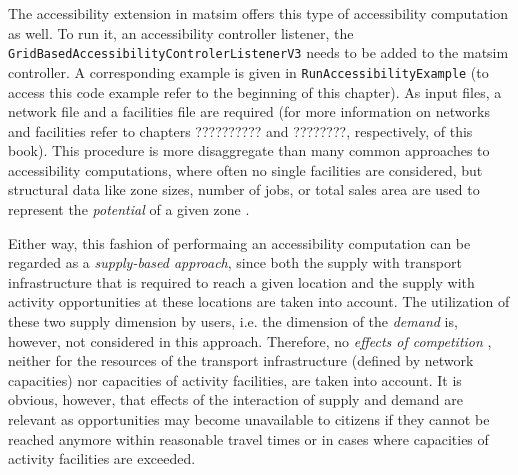 %

The accessibility extension in \gls{matsim} offers this type of accessibility computation as well. To run it, an 
accessibility controller listener, \eg the \lstinline{GridBasedAccessibilityControlerListenerV3} needs to be added to 
the \gls{matsim} controller. A corresponding example is given in \lstinline{RunAccessibilityExample} (to access this 
code example refer to the beginning of this chapter). As input files, a network file and a facilities file are required
(for more information on networks and facilities refer to chapters ?????????? and ????????, respectively, of this book).
This procedure is more disaggregate than many common approaches to accessibility computations, where often no single 
facilities are considered, but structural data like zone sizes, number of jobs, or total sales area are used to 
represent the \textit{potential} of a given zone 
\citep{BuettnerEtAl2010Erreichbarkeitsatlas, GulhanEtAl2014PotentialAccessibilityMeasureDenizli}.


Either way, this fashion of performaing an accessibility computation can be regarded as a \textit{supply-based approach}, 
since both the supply with transport infrastructure that is required to reach a given location and the supply with 
activity opportunities at these locations are taken into account. The utilization of these two supply dimension by users, 
i.e. the dimension of the \textit{demand} is, however, not considered in this approach. Therefore, no 
\textit{effects of competition} \citep{Geurs2004AccessibilityReview}, neither for the resources of the transport 
infrastructure (defined by network capacities) nor capacities of activity facilities, are taken into account. It is 
obvious, however, that effects of the interaction of supply and demand are relevant as opportunities may become 
unavailable to citizens if they cannot be reached anymore within reasonable travel times or in cases where capacities 
of activity facilities are exceeded. 

